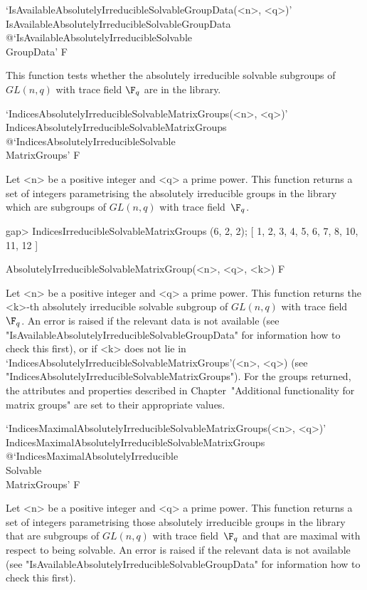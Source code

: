 \>`IsAvailableAbsolutelyIrreducibleSolvableGroupData(<n>, <q>)'%
{IsAvailableAbsolutelyIrreducibleSolvableGroupData}%
@{`IsAvailableAbsolutelyIrreducibleSolvable\\GroupData'} F

This function tests whether the
absolutely irreducible solvable subgroups of $GL(n,q)$ with trace field $\F_q$ are in the {\IRREDSOL} library.


\>`IndicesAbsolutelyIrreducibleSolvableMatrixGroups(<n>, <q>)'%
{IndicesAbsolutelyIrreducibleSolvableMatrixGroups}%
@{`IndicesAbsolutelyIrreducibleSolvable\\MatrixGroups'} F

Let <n> be a  positive integer and <q> a prime power. This
function returns a set of integers parametrising the absolutely irreducible groups in the
{\IRREDSOL} library which are subgroups of $GL(n,q)$ with trace field~$\F_q$.

\beginexample
gap> IndicesIrreducibleSolvableMatrixGroups (6, 2, 2);
[ 1, 2, 3, 4, 5, 6, 7, 8, 10, 11, 12 ]
\endexample

\>AbsolutelyIrreducibleSolvableMatrixGroup(<n>, <q>, <k>) F

Let <n> be a  positive integer and <q> a prime power. This
function returns the <k>-th absolutely irreducible solvable subgroup of $GL(n,q)$ with trace 
field~$\F_q$. An error is raised if the relevant
data is not available (see "IsAvailableAbsolutelyIrreducibleSolvableGroupData" for information 
how to check this first), or if <k> does not lie in
`IndicesAbsolutelyIrreducibleSolvableMatrixGroups'(<n>, <q>)
(see "IndicesAbsolutelyIrreducibleSolvableMatrixGroups"). For the groups returned, 
the attributes and properties described in Chapter~"Additional functionality for matrix groups" 
are set to their appropriate values.


\>`IndicesMaximalAbsolutelyIrreducibleSolvableMatrixGroups(<n>, <q>)'%
{IndicesMaximalAbsolutelyIrreducibleSolvableMatrixGroups}%
@{`IndicesMaximalAbsolutelyIrreducible\\Solvable\\MatrixGroups'} F

Let <n> be a  positive integer and <q> a prime power. This
function returns a set of integers parametrising those absolutely irreducible groups in the
{\IRREDSOL} library that are subgroups of $GL(n,q)$ with trace field~$\F_q $ and that are maximal with
respect to being solvable. An error is raised if the relevant
data is not available (see "IsAvailableAbsolutelyIrreducibleSolvableGroupData" for information 
how to check this first).

